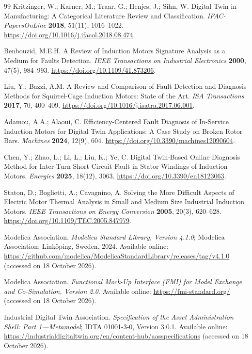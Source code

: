 \documentclass[machines,article,submit,moreauthors]{Definitions/mdpi}
\begin{document}
\begin{thebibliography}{99}
 Kritzinger, W.; Karner, M.; Traar, G.; Henjes, J.; Sihn, W. Digital Twin in Manufacturing: A Categorical Literature Review and Classification. \emph{IFAC-PapersOnLine} \textbf{2018}, 51(11), 1016--1022. \url{https://doi.org/10.1016/j.ifacol.2018.08.474}.

 Benbouzid, M.E.H. A Review of Induction Motors Signature Analysis as a Medium for Faults Detection. \emph{IEEE Transactions on Industrial Electronics} \textbf{2000}, 47(5), 984--993. \url{https://doi.org/10.1109/41.873206}.

 Liu, Y.; Bazzi, A.M. A Review and Comparison of Fault Detection and Diagnosis Methods for Squirrel-Cage Induction Motors: State of the Art. \emph{ISA Transactions} \textbf{2017}, 70, 400--409. \url{https://doi.org/10.1016/j.isatra.2017.06.001}.

 Adamou, A.A.; Alaoui, C. Efficiency-Centered Fault Diagnosis of In-Service Induction Motors for Digital Twin Applications: A Case Study on Broken Rotor Bars. \emph{Machines} \textbf{2024}, 12(9), 604. \url{https://doi.org/10.3390/machines12090604}.

 Chen, Y.; Zhao, L.; Li, L.; Liu, K.; Ye, C. Digital Twin-Based Online Diagnosis Method for Inter-Turn Short Circuit Fault in Stator Windings of Induction Motors. \emph{Energies} \textbf{2025}, 18(12), 3063. \url{https://doi.org/10.3390/en18123063}.

 Staton, D.; Boglietti, A.; Cavagnino, A. Solving the More Difficult Aspects of Electric Motor Thermal Analysis in Small and Medium Size Industrial Induction Motors. \emph{IEEE Transactions on Energy Conversion} \textbf{2005}, 20(3), 620--628. \url{https://doi.org/10.1109/TEC.2005.847979}.

 Modelica Association. \emph{Modelica Standard Library, Version 4.1.0}; Modelica Association: Linköping, Sweden, 2024. Available online: \url{https://github.com/modelica/ModelicaStandardLibrary/releases/tag/v4.1.0} (accessed on 18 October 2026).

 Modelica Association. \emph{Functional Mock-Up Interface (FMI) for Model Exchange and Co-Simulation, Version 2.0}. Available online: \url{https://fmi-standard.org/} (accessed on 18 October 2026).

 Industrial Digital Twin Association. \emph{Specification of the Asset Administration Shell: Part 1—Metamodel}; IDTA 01001-3-0, Version 3.0.1. Available online: \url{https://industrialdigitaltwin.org/en/content-hub/aasspecifications} (accessed on 18 October 2026).
\end{thebibliography}
\end{document}
